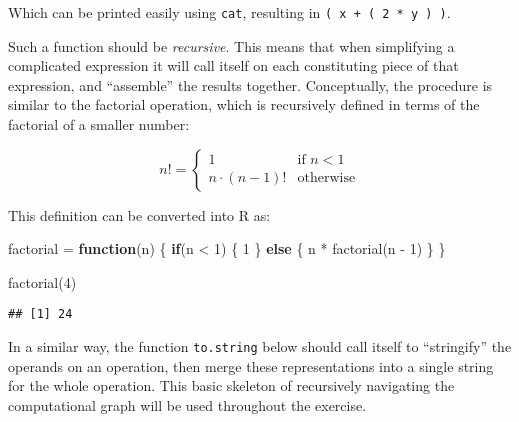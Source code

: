 \documentclass[
  a4paper,
]{article}
\newenvironment{Shaded}{\begin{snugshade}}{\end{snugshade}}
\newcommand{\ControlFlowTok}[1]{\textcolor[rgb]{0.13,0.29,0.53}{\textbf{#1}}}
\newcommand{\DecValTok}[1]{\textcolor[rgb]{0.00,0.00,0.81}{#1}}
\newcommand{\FunctionTok}[1]{\textcolor[rgb]{0.00,0.00,0.00}{#1}}
\newcommand{\NormalTok}[1]{#1}
\newcommand{\OtherTok}[1]{\textcolor[rgb]{0.56,0.35,0.01}{#1}}
\newcommand{\SpecialCharTok}[1]{\textcolor[rgb]{0.00,0.00,0.00}{#1}}
\begin{document}
Which can be printed easily using \texttt{cat}, resulting in
\texttt{(\ x\ +\ (\ 2\ *\ y\ )\ )}.

Such a function should be \emph{recursive}. This means that when
simplifying a complicated expression it will call itself on each
constituting piece of that expression, and ``assemble'' the results
together. Conceptually, the procedure is similar to the factorial
operation, which is recursively defined in terms of the factorial of a
smaller number:

\begin{equation}
n!=\begin{cases}
1 & \text{if }n < 1 \\
n\cdot(n-1)! & \text{otherwise}
\end{cases}
\end{equation}

This definition can be converted into R as:

\begin{Shaded}
\begin{Highlighting}[]
\NormalTok{factorial }\OtherTok{=} \ControlFlowTok{function}\NormalTok{(n) \{}
  \ControlFlowTok{if}\NormalTok{(n }\SpecialCharTok{\textless{}} \DecValTok{1}\NormalTok{) \{}
    \DecValTok{1}
\NormalTok{  \}}
  \ControlFlowTok{else}\NormalTok{ \{}
\NormalTok{    n }\SpecialCharTok{*} \FunctionTok{factorial}\NormalTok{(n }\SpecialCharTok{{-}} \DecValTok{1}\NormalTok{)}
\NormalTok{  \}}
\NormalTok{\}}

\FunctionTok{factorial}\NormalTok{(}\DecValTok{4}\NormalTok{)}
\end{Highlighting}
\end{Shaded}

\begin{verbatim}
## [1] 24
\end{verbatim}

In a similar way, the function \texttt{to.string} below should call
itself to ``stringify'' the operands on an operation, then merge these
representations into a single string for the whole operation. This basic
skeleton of recursively navigating the computational graph will be used
throughout the exercise.
\end{document}
